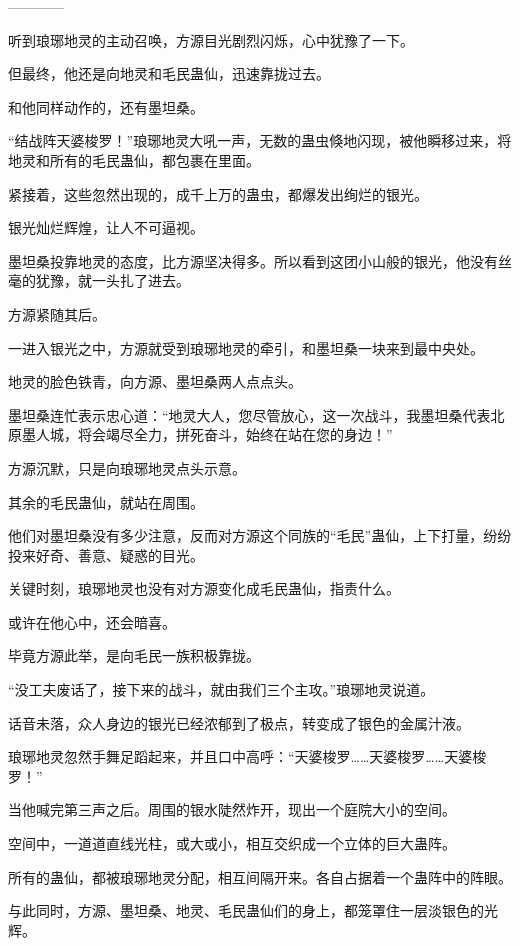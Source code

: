 
\begin{this_body}

------------

听到琅琊地灵的主动召唤，方源目光剧烈闪烁，心中犹豫了一下。

但最终，他还是向地灵和毛民蛊仙，迅速靠拢过去。

和他同样动作的，还有墨坦桑。

“结战阵天婆梭罗！”琅琊地灵大吼一声，无数的蛊虫倏地闪现，被他瞬移过来，将地灵和所有的毛民蛊仙，都包裹在里面。

紧接着，这些忽然出现的，成千上万的蛊虫，都爆发出绚烂的银光。

银光灿烂辉煌，让人不可逼视。

墨坦桑投靠地灵的态度，比方源坚决得多。所以看到这团小山般的银光，他没有丝毫的犹豫，就一头扎了进去。

方源紧随其后。

一进入银光之中，方源就受到琅琊地灵的牵引，和墨坦桑一块来到最中央处。

地灵的脸色铁青，向方源、墨坦桑两人点点头。

墨坦桑连忙表示忠心道：“地灵大人，您尽管放心，这一次战斗，我墨坦桑代表北原墨人城，将会竭尽全力，拼死奋斗，始终在站在您的身边！”

方源沉默，只是向琅琊地灵点头示意。

其余的毛民蛊仙，就站在周围。

他们对墨坦桑没有多少注意，反而对方源这个同族的“毛民”蛊仙，上下打量，纷纷投来好奇、善意、疑惑的目光。

关键时刻，琅琊地灵也没有对方源变化成毛民蛊仙，指责什么。

或许在他心中，还会暗喜。

毕竟方源此举，是向毛民一族积极靠拢。

“没工夫废话了，接下来的战斗，就由我们三个主攻。”琅琊地灵说道。

话音未落，众人身边的银光已经浓郁到了极点，转变成了银色的金属汁液。

琅琊地灵忽然手舞足蹈起来，并且口中高呼：“天婆梭罗……天婆梭罗……天婆梭罗！”

当他喊完第三声之后。周围的银水陡然炸开，现出一个庭院大小的空间。

空间中，一道道直线光柱，或大或小，相互交织成一个立体的巨大蛊阵。

所有的蛊仙，都被琅琊地灵分配，相互间隔开来。各自占据着一个蛊阵中的阵眼。

与此同时，方源、墨坦桑、地灵、毛民蛊仙们的身上，都笼罩住一层淡银色的光辉。


\end{this_body}
